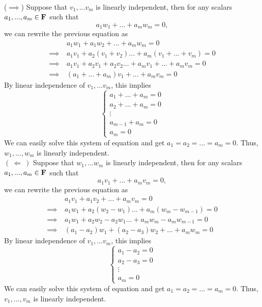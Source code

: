 \begin{solution}
    \\ ($\implies$) Suppose that $v_1, ... v_m$ is linearly independent, then for any scalars $a_1, ..., a_m \in \mathbf{F}$ such that
    $$a_1w_1 + ... + a_m w_m = 0,$$
    we can rewrite the previous equation as 
    \begin{align*}
        & a_1w_1 + a_1 w_2 + ... + a_m w_m = 0 \\
        \implies \ & a_1v_1 + a_2(v_1 + v_2)... + a_m (v_1 + ... + v_m) = 0 \\
        \implies \ & a_1v_1 + a_2v_1 + a_2v_2... + a_mv_1 + ... + a_mv_m = 0 \\
        \implies \ & (a_1 + ... + a_m)v_1 + ... + a_m v_m = 0
    \end{align*}
    By linear independence of $v_1, ... v_m$, this implies
    $$\begin{cases} a_1 + ... + a_m = 0 \\ a_2 + ... + a_m = 0 \\ \vdots \\ a_{m-1} + a_m = 0 \\ a_m = 0 \end{cases}$$
    We can easily solve this system of equation and get $a_1 = a_2 = ... = a_m = 0$. Thus, $w_1, ..., w_m$ is linearly independent. \\

    \noindent $( \ \Longleftarrow \ )$ Suppose that $w_1, ... w_m$ is linearly independent, then for any scalars $a_1, ..., a_m \in \mathbf{F}$ such that
    $$a_1v_1 + ... + a_m v_m = 0,$$
    we can rewrite the previous equation as 
    \begin{align*}
        & a_1v_1 + a_1 v_2 + ... + a_m v_m = 0 \\
        \implies \ & a_1 w_1 + a_2(w_2 - w_1)... + a_m (w_m - w_{m-1}) = 0 \\
        \implies \ & a_1 w_1 + a_2w_2 - a_2 w_1... + a_m w_m - a_m w_{m-1} = 0 \\
        \implies \ & (a_1 - a_2)w_1 + (a_2 - a_3)w_2 + ... + a_m w_m = 0
    \end{align*}
    By linear independence of $v_1, ... v_m$, this implies
    $$\begin{cases} a_1 - a_2 = 0 \\ a_2 - a_3 = 0 \\ \vdots \\ a_m = 0 \end{cases}$$
    We can easily solve this system of equation and get $a_1 = a_2 = ... = a_m = 0$. Thus, $v_1, ..., v_m$ is linearly independent. \\
\end{solution}

